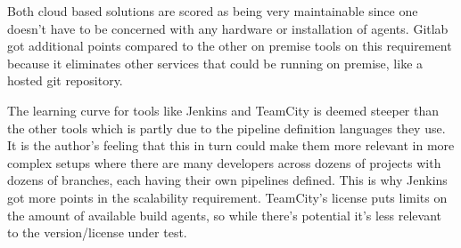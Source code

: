 Both cloud based solutions are scored as being very maintainable since one doesn't have to be concerned with any hardware or installation of agents. Gitlab got additional points compared to the other on premise tools on this requirement because it eliminates other services that could be running on premise, like a hosted git repository.

\pagebreak

The learning curve for tools like Jenkins and TeamCity is deemed steeper than the other tools which is partly due to the pipeline definition languages they use. It is the author's feeling that this in turn could make them more relevant in more complex setups where there are many developers across dozens of projects with dozens of branches, each having their own pipelines defined. This is why Jenkins got more points in the scalability requirement. TeamCity's license puts limits on the amount of available build agents, so while there's potential it's less relevant to the version/license under test. 


